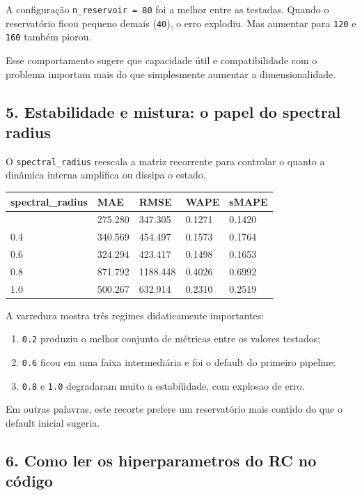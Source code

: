 \documentclass[12pt]{article}
\providecommand{\tightlist}{%
          \setlength{\itemsep}{0pt}\setlength{\parskip}{0pt}}
\begin{document}
A configuração \texttt{n\_reservoir\ =\ 80} foi a melhor entre as testadas. Quando o reservatório ficou pequeno demais (\texttt{40}), o erro explodiu. Mas aumentar para \texttt{120} e \texttt{160} também piorou.

Esse comportamento sugere que capacidade útil e compatibilidade com o problema importam mais do que simplesmente aumentar a dimensionalidade.

\subsection{5. Estabilidade e mistura: o papel do spectral radius}\label{5-estabilidade-e-mistura-o-papel-do-spectral-radius}

O \texttt{spectral\_radius} reescala a matriz recorrente para controlar o quanto a dinâmica interna amplifica ou dissipa o estado.

\begin{longtable}[]{@{}lllll@{}}
\toprule\noalign{}
spectral\_radius & MAE & RMSE & WAPE & sMAPE \\
\midrule\noalign{}
\endhead
\bottomrule\noalign{}
\endlastfoot
0.2 & 275.280 & 347.305 & 0.1271 & 0.1420 \\
0.4 & 340.569 & 454.497 & 0.1573 & 0.1764 \\
0.6 & 324.294 & 423.417 & 0.1498 & 0.1653 \\
0.8 & 871.792 & 1188.448 & 0.4026 & 0.6992 \\
1.0 & 500.267 & 632.914 & 0.2310 & 0.2519 \\
\end{longtable}

A varredura mostra três regimes didaticamente importantes:

\begin{enumerate}
\def\labelenumi{\arabic{enumi}.}
\tightlist
\item
  \texttt{0.2} produziu o melhor conjunto de métricas entre os valores testados;
\item
  \texttt{0.6} ficou em uma faixa intermediária e foi o default do primeiro pipeline;
\item
  \texttt{0.8} e \texttt{1.0} degradaram muito a estabilidade, com explosao de erro.
\end{enumerate}

Em outras palavras, este recorte prefere um reservatório mais contido do que o default inicial sugeria.

\subsection{6. Como ler os hiperparametros do RC no código}\label{6-como-ler-os-hiperparametros-do-rc-no-cuxf3digo}
\end{document}
